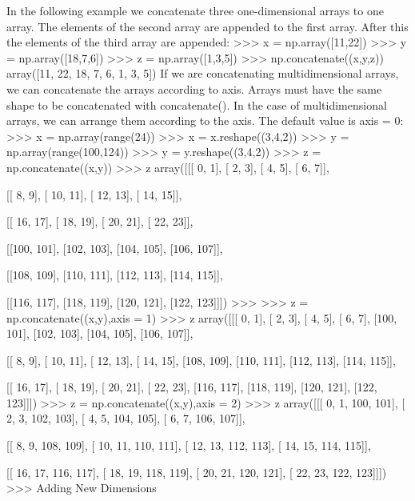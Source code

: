 In the following example we concatenate three one-dimensional arrays to one array. The elements of the second array are appended to the first array. After this the elements of the third array are appended:
>>> x = np.array([11,22])
>>> y = np.array([18,7,6])
>>> z = np.array([1,3,5])
>>> np.concatenate((x,y,z))
array([11, 22, 18,  7,  6,  1,  3,  5])
If we are concatenating multidimensional arrays, we can concatenate the arrays according to axis. Arrays must have the same shape to be concatenated with concatenate(). In the case of multidimensional arrays, we can arrange them according to the axis. The default value is axis = 0:
>>> x = np.array(range(24))
>>> x = x.reshape((3,4,2))
>>> y = np.array(range(100,124))
>>> y = y.reshape((3,4,2))
>>> z = np.concatenate((x,y))
>>> z
array([[[  0,   1],
        [  2,   3],
        [  4,   5],
        [  6,   7]],

       [[  8,   9],
        [ 10,  11],
        [ 12,  13],
        [ 14,  15]],

       [[ 16,  17],
        [ 18,  19],
        [ 20,  21],
        [ 22,  23]],

       [[100, 101],
        [102, 103],
        [104, 105],
        [106, 107]],

       [[108, 109],
        [110, 111],
        [112, 113],
        [114, 115]],

       [[116, 117],
        [118, 119],
        [120, 121],
        [122, 123]]])
>>> 
>>> z = np.concatenate((x,y),axis = 1)
>>> z
array([[[  0,   1],
        [  2,   3],
        [  4,   5],
        [  6,   7],
        [100, 101],
        [102, 103],
        [104, 105],
        [106, 107]],

       [[  8,   9],
        [ 10,  11],
        [ 12,  13],
        [ 14,  15],
        [108, 109],
        [110, 111],
        [112, 113],
        [114, 115]],

       [[ 16,  17],
        [ 18,  19],
        [ 20,  21],
        [ 22,  23],
        [116, 117],
        [118, 119],
        [120, 121],
        [122, 123]]])
>>> z = np.concatenate((x,y),axis = 2)
>>> z
array([[[  0,   1, 100, 101],
        [  2,   3, 102, 103],
        [  4,   5, 104, 105],
        [  6,   7, 106, 107]],

       [[  8,   9, 108, 109],
        [ 10,  11, 110, 111],
        [ 12,  13, 112, 113],
        [ 14,  15, 114, 115]],

       [[ 16,  17, 116, 117],
        [ 18,  19, 118, 119],
        [ 20,  21, 120, 121],
        [ 22,  23, 122, 123]]])
>>> 
Adding New Dimensions

